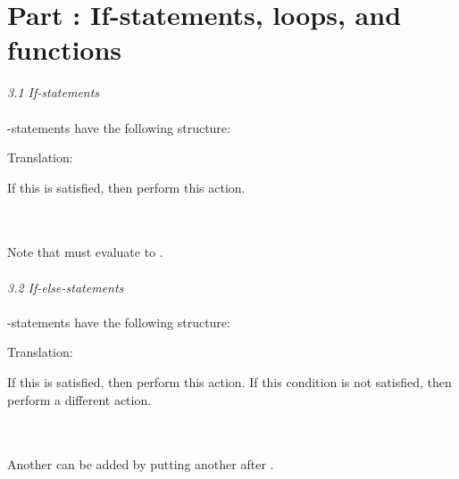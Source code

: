 \label{rhelppartthree}

\section{Part : If-statements, loops, and functions}

\textit{3.1 If-statements} \\
\\
-statements have the following structure: \\


\begin{minipage}[t]{0.2\textwidth}
Translation:
\end{minipage}
\begin{minipage}[t]{0.8\textwidth}
If this  is satisfied, then perform this action.
\end{minipage} \\
\\
Note that  must evaluate to . \\
\\ 
\textit{3.2 If-else-statements} \\
\\
-statements have the following structure: \\


\begin{minipage}[t]{0.2\textwidth}
Translation:
\end{minipage}
\begin{minipage}[t]{0.8\textwidth}
If this  is satisfied, then perform this action. If this condition is not satisfied, then perform a different action.
\end{minipage} \\
\\
Another  can be added by putting another  after . \\

